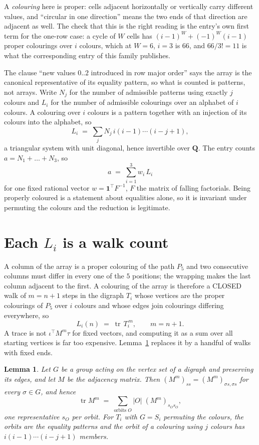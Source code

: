 \documentclass[11pt,a4paper]{article}
\theoremstyle{plain}
\newtheorem{lemma}[theorem]{Lemma}
\theoremstyle{definition}
\begin{document}
A \emph{colouring} here is proper: cells adjacent horizontally or vertically carry different
values, and ``circular in one direction'' means the two ends of that direction are adjacent as
well. The check that this is the right reading is the entry's own first term for the
one-row case: a cycle of $W$ cells has $(i-1)^W+(-1)^W(i-1)$ proper colourings over $i$
colours, which at $W=6$, $i=3$ is $66$, and $66/3!=11$ is what the corresponding entry of this
family publishes.

The clause ``new values $0..2$ introduced in row major order'' says the array is the
canonical representative of its equality pattern, so what is counted is patterns, not arrays.
Write $N_j$ for the number of admissible patterns using exactly $j$ colours and $L_i$ for the
number of admissible colourings over an alphabet of $i$ colours. A colouring over $i$ colours
is a pattern together with an injection of its colours into the alphabet, so
\[
L_i\;=\;\sum_j N_j\,i(i-1)\cdots(i-j+1),
\]
a triangular system with unit diagonal, hence invertible over $\mathbf{Q}$. The entry counts
$a=N_1+\dots+N_{3}$, so
\[
a\;=\;\sum_{i=1}^{3}w_i\,L_i
\]
for one fixed rational vector $w=\mathbf{1}^{\!\top}F^{-1}$, $F$ the matrix of falling
factorials. Being properly coloured is a statement about equalities alone, so it is invariant
under permuting the colours and the reduction is legitimate.

\section{Each $L_i$ is a walk count}

A column of the array is a proper colouring of the path $P_{5}$ and two consecutive
columns must differ in every one of the $5$ positions; the wrapping makes the last column
adjacent to the first. A colouring of the array is therefore a CLOSED walk of $m=n+1$ steps
in the digraph $T_i$ whose vertices are the proper colourings of $P_{5}$ over $i$ colours
and whose edges join colourings differing everywhere, so
\[
L_i(n)\;=\;\operatorname{tr}\,T_i^{\,m},\qquad m=n+1.
\]
A trace is not $\iota^{\!\top}M^m\tau$ for fixed vectors, and computing it as a sum over all
starting vertices is far too expensive. Lemma~\ref{lem:trace} replaces it by a handful of
walks with fixed ends.

\begin{lemma}\label{lem:trace}
Let $G$ be a group acting on the vertex set of a digraph and preserving its edges, and let $M$
be the adjacency matrix. Then $(M^m)_{ss}=(M^m)_{\sigma s,\sigma s}$ for every
$\sigma\in G$, and hence
\[
\operatorname{tr} M^m\;=\;\sum_{\text{orbits }O}|O|\;(M^m)_{s_O s_O} ,
\]
one representative $s_O$ per orbit. For $T_i$ with $G=S_i$ permuting the colours, the orbits
are the equality patterns and the orbit of a colouring using $j$ colours has
$i(i-1)\cdots(i-j+1)$ members.
\end{lemma}
\end{document}
